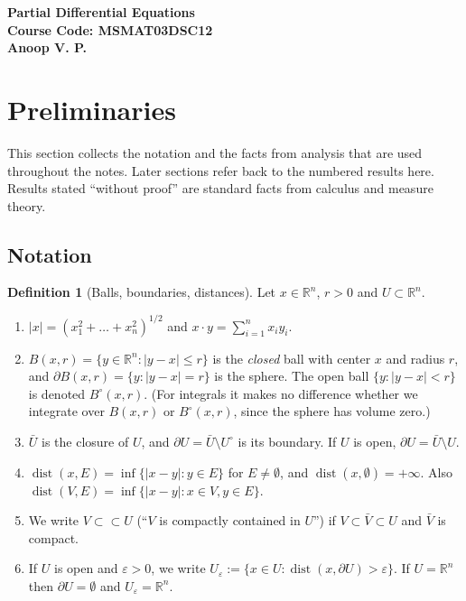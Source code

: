 \documentclass[11pt]{article}
\theoremstyle{plain}
\theoremstyle{definition}
\newtheorem{definition}[theorem]{Definition}
\theoremstyle{remark}
\begin{document}
\begin{center}
\textbf{\Large Partial Differential Equations } \\[0.5em]
\textbf{Course Code: MSMAT03DSC12} \\[0.5em]
\textbf{Anoop V. P.}
\end{center}

\setcounter{section}{-1}
\section{Preliminaries}\label{sec:zero}
This section collects the notation and the facts from analysis that are used throughout the notes. Later sections refer back to the numbered results here. Results stated ``without proof'' are standard facts from calculus and measure theory.

\subsection{Notation}\label{ssec:notation}

\begin{definition}[Balls, boundaries, distances]\label{def:balls}
Let $x \in \mathbb{R}^n$, $r > 0$ and $U \subset \mathbb{R}^n$.
\begin{enumerate}
    \item $|x| = (x_1^2 + \dots + x_n^2)^{1/2}$ and $x \cdot y = \sum_{i=1}^n x_i y_i$.
    \item $B(x,r) = \{ y \in \mathbb{R}^n : |y - x| \leq r \}$ is the \emph{closed} ball with center $x$ and radius $r$, and $\partial B(x,r) = \{ y : |y-x| = r\}$ is the sphere. The open ball $\{ y : |y-x| < r \}$ is denoted $B^\circ(x,r)$. (For integrals it makes no difference whether we integrate over $B(x,r)$ or $B^\circ(x,r)$, since the sphere has volume zero.)
    \item $\bar U$ is the closure of $U$, and $\partial U = \bar U \setminus U^\circ$ is its boundary. If $U$ is open, $\partial U = \bar U \setminus U$.
    \item $\operatorname{dist}(x, E) = \inf\{ |x - y| : y \in E \}$ for $E \neq \emptyset$, and $\operatorname{dist}(x, \emptyset) = +\infty$. Also $\operatorname{dist}(V, E) = \inf\{|x-y| : x \in V, y \in E\}$.
    \item We write $V \subset\subset U$ (``$V$ is compactly contained in $U$'') if $V \subset \bar V \subset U$ and $\bar V$ is compact.
    \item If $U$ is open and $\varepsilon > 0$, we write $U_\varepsilon := \{ x \in U : \operatorname{dist}(x, \partial U) > \varepsilon \}$. If $U = \mathbb{R}^n$ then $\partial U = \emptyset$ and $U_\varepsilon = \mathbb{R}^n$.
\end{enumerate}
\end{definition}
\end{document}
